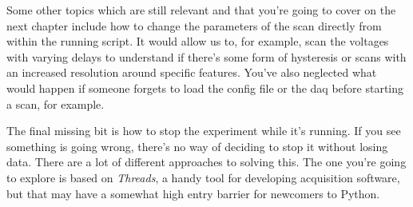 Some other topics which are still relevant and that you're going to cover on the next chapter include how to change the parameters of the scan directly from within the running script. It would allow us to, for example, scan the voltages with varying delays to understand if there's some form of hysteresis or scans with an increased resolution around specific features. You've also neglected what would happen if someone forgets to load the config file or the daq before starting a scan, for example.

The final missing bit is how to stop the experiment while it's running. If you see something is going wrong, there's no way of deciding to stop it without losing data. There are a lot of different approaches to solving this. The one you're going to explore is based on \emph{Threads}, a handy tool for developing acquisition software, but that may have a somewhat high entry barrier for newcomers to Python.
